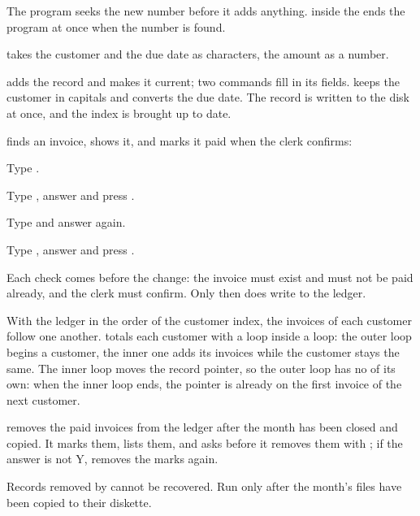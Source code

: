The program seeks the new number before it adds
anything.   inside the  ends the program at once when the
number is found.

 takes the customer and the due date as
characters,  the amount as a number.

 adds the record and makes it current;
two  commands fill in its fields.   keeps the customer in
capitals and  converts the due date.  The record is written to the
disk at once, and the index is brought up to date.

 finds an invoice, shows it, and marks it paid when the clerk
confirms:
\begin{Steps}[resume]
\item Type .
\item Type , answer  and press .
\item Type  and answer  again.
\item Type , answer  and press .
\end{Steps}
Each check comes before the change: the invoice must exist and must not be paid
already, and the clerk must confirm.  Only then does  write to the
ledger.

With the ledger in the order of the customer index, the invoices of each
customer follow one another.   totals each customer with a loop
inside a loop: the outer loop begins a customer, the inner one adds its
invoices while the customer stays the same.
The inner loop moves the record pointer, so the outer loop has no 
of its own: when the inner loop ends, the pointer is already on the first
invoice of the next customer.

 removes the paid invoices from the ledger after the month has
been closed and copied.  It marks them, lists them, and asks before it
removes them with ; if the answer is not Y,  removes the
marks again.
\begin{AteWarning}
Records removed by  cannot be recovered.  Run  only
after the month's files have been copied to their diskette.
\end{AteWarning}

